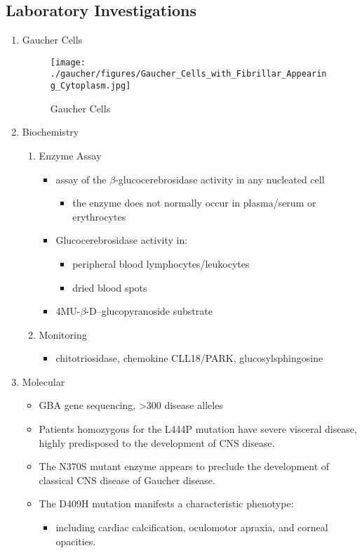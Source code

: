 \documentclass{scrartcl}
\begin{document}
\subsection{Laboratory Investigations}
\label{sec:orga10473b}
\begin{enumerate}
\item Gaucher Cells
\label{sec:org3f44409}

\begin{figure}[htbp]
\centering
\texttt{[image: ./gaucher/figures/Gaucher\_Cells\_with\_Fibrillar\_Appearing\_Cytoplasm.jpg]}
\caption{\label{fig:org66d7181}
Gaucher Cells}
\end{figure}

\item Biochemistry
\label{sec:orge7a7e92}
\begin{enumerate}
\item Enzyme Assay
\label{sec:orgc7903ac}
\begin{itemize}
\item assay of the \(\beta\)-glucocerebrosidase activity in any nucleated cell
\begin{itemize}
\item the enzyme does not normally occur in plasma/serum or erythrocytes
\end{itemize}
\item Glucocerebrosidase activity in:
\begin{itemize}
\item peripheral blood lymphocytes/leukocytes
\item dried blood spots
\end{itemize}
\item 4MU-\(\beta\)-D--glucopyranoside substrate
\end{itemize}

\item Monitoring
\label{sec:orgac949c9}
\begin{itemize}
\item chitotriosidase, chemokine CLL18/PARK, glucosylsphingosine
\end{itemize}
\end{enumerate}

\item Molecular
\label{sec:org2571a07}

\begin{itemize}
\item GBA gene sequencing, >300 disease alleles
\item Patients homozygous for the L444P mutation have severe visceral
disease, highly predisposed to the development of CNS disease.
\item The N370S mutant enzyme appears to preclude the development of classical CNS disease of Gaucher disease.
\item The D409H mutation manifests a characteristic phenotype:
\begin{itemize}
\item including cardiac calcification, oculomotor apraxia, and corneal opacities.
\end{itemize}
\end{itemize}
\end{enumerate}
\end{document}
